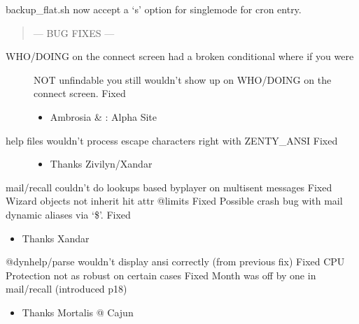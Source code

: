 \documentclass[letterpaper,10pt,english]{sphinxmanual}
\begin{document}
\sphinxAtStartPar
backup\_flat.sh now accept a ‘\sphinxhyphen{}s’ option for single\sphinxhyphen{}mode for cron entry.
\begin{quote}

\sphinxAtStartPar
— BUG FIXES —
\end{quote}
\begin{description}
\item[{WHO/DOING on the connect screen had a broken conditional where if you were}] \leavevmode
\sphinxAtStartPar
NOT unfindable you still wouldn’t show up on WHO/DOING on the connect
screen.  \sphinxhyphen{} Fixed
\begin{itemize}
\item {} 
\sphinxAtStartPar
Ambrosia \& : Alpha Site

\end{itemize}

\item[{help files wouldn’t process escape characters right with ZENTY\_ANSI \sphinxhyphen{} Fixed}] \leavevmode\begin{itemize}
\item {} 
\sphinxAtStartPar
Thanks Zivilyn/Xandar

\end{itemize}

\end{description}

\sphinxAtStartPar
mail/recall couldn’t do lookups based by\sphinxhyphen{}player on multi\sphinxhyphen{}sent messages \sphinxhyphen{} Fixed
Wizard objects not inherit hit attr @limits \sphinxhyphen{} Fixed
Possible crash bug with mail dynamic aliases via ‘\$’.  \sphinxhyphen{} Fixed
\begin{itemize}
\item {} 
\sphinxAtStartPar
Thanks Xandar

\end{itemize}

\sphinxAtStartPar
@dynhelp/parse wouldn’t display ansi correctly (from previous fix) \sphinxhyphen{} Fixed
CPU Protection not as robust on certain cases \sphinxhyphen{} Fixed
Month was off by one in mail/recall (introduced p18)
\begin{itemize}
\item {} 
\sphinxAtStartPar
Thanks Mortalis @ Cajun

\end{itemize}
\end{document}
